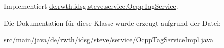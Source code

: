 Implementiert \hyperlink{interfacede_1_1rwth_1_1idsg_1_1steve_1_1service_1_1_ocpp_tag_service_afe5afe05ed4f072302ed4ed7622dba76}{de.\-rwth.\-idsg.\-steve.\-service.\-Ocpp\-Tag\-Service}.



Die Dokumentation für diese Klasse wurde erzeugt aufgrund der Datei\-:\begin{DoxyCompactItemize}
\item 
src/main/java/de/rwth/idsg/steve/service/\hyperlink{_ocpp_tag_service_impl_8java}{Ocpp\-Tag\-Service\-Impl.\-java}\end{DoxyCompactItemize}
